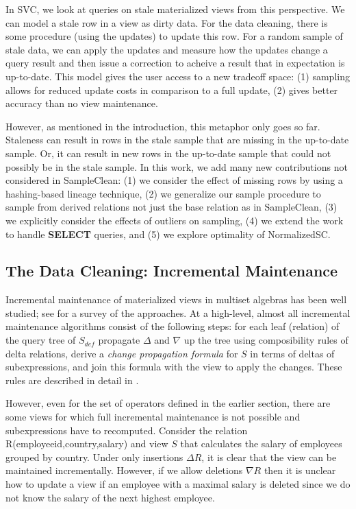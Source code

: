 In SVC, we look at queries on stale materialized views from this perspective.
We can model a stale row in a view as dirty data.
For the data cleaning, there is some procedure (using the updates) to update this row.
For a random sample of stale data, we can apply the updates and measure how the updates change a query result and then issue a correction to acheive a result that in expectation is up-to-date.
This model gives the user access to a new tradeoff space: (1) sampling allows for reduced update costs in comparison to a full update, (2) gives better accuracy than no view maintenance.   

However, as mentioned in the introduction, this metaphor only goes so far.
Staleness can result in rows in the stale sample that are missing in the up-to-date sample.
Or, it can result in new rows in the up-to-date sample that could not possibly be in the stale sample.
In this work, we add many new contributions not considered in SampleClean: (1) we consider the effect of missing rows by using a hashing-based lineage technique, (2) we generalize our sample procedure to sample from derived relations not just the base relation as in SampleClean, (3) we explicitly consider the effects of outliers on sampling, (4) we extend the work to handle \textbf{SELECT} queries, and (5) we explore optimality of NormalizedSC.

\subsection{The Data Cleaning: Incremental Maintenance}\label{subsec-inc}
Incremental maintenance of materialized views in multiset algebras has been well studied; see \cite{chirkova2011materialized} for a survey of the approaches. 
At a high-level, almost all incremental maintenance algorithms consist of the following steps: for each leaf (relation) of the query tree of $S_{def}$ propagate $\Delta$ and $\nabla$ up the tree using composibility rules of delta relations, derive a \emph{change propagation formula} for $S$ in terms of deltas of subexpressions, and join this formula with the view to apply the changes. 
These rules are described in detail in \cite{DBLP:journals/vldb/KochAKNNLS14, DBLP:conf/pods/Koch10}.

However, even for the set of operators defined in the earlier section, there are some views for which full incremental maintenance is not possible and subexpressions have to recomputed. Consider the relation R(employeeid,country,salary) and view $S$ that calculates the \maxfunc salary of employees grouped by country. Under only insertions $\Delta R$, it is clear that the view can be maintained incrementally. 
However, if we allow deletions $\nabla R$ then it is unclear how to update a view if an employee with a maximal salary is deleted since we do not know the salary of the next highest employee. 

